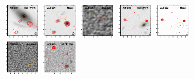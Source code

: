 \documentclass[iop]{emulateapj}
\begin{document}
\begin{figure}[!tbp] 
    \begin{centering}
\includegraphics[width=0.162\textwidth]{../Figures/modelfit/ADFS01_optical_bestfit.pdf}
\includegraphics[width=0.162\textwidth]{../Figures/modelfit/ADFS01_model_bestfit.pdf}
\includegraphics[width=0.162\textwidth]{../Figures/modelfit/ADFS01_residual_bestfit.pdf}
\includegraphics[width=0.162\textwidth]{../Figures/modelfit/ADFS02_optical_bestfit.pdf}
\includegraphics[width=0.162\textwidth]{../Figures/modelfit/ADFS02_model_bestfit.pdf}
\includegraphics[width=0.162\textwidth]{../Figures/modelfit/ADFS02_residual_bestfit.pdf}
\includegraphics[width=0.162\textwidth]{../Figures/modelfit/ADFS03_optical_bestfit.pdf}

\end{centering}
\end{figure}
\end{document}

